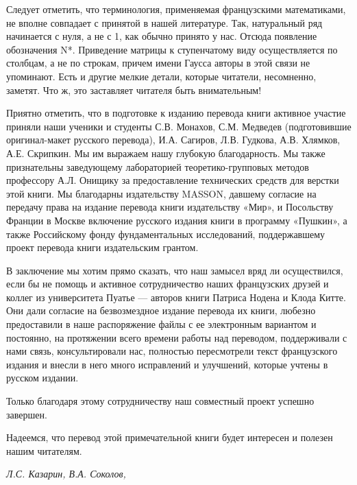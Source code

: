 {{   Следует отметить, что терминология, применяемая французскими математиками, не вполне совпадает с принятой в нашей литературе. Так, натуральный ряд начинается с нуля, а не с 1, как обычно принято у нас. Отсюда появление обозначения N*. Приведение матрицы к ступенчатому виду осуществляется по столбцам, а не по строкам, причем имени Гаусса авторы в этой связи не упоминают. Есть и другие мелкие детали, которые читатели, несомненно, заметят. Что ж, это заставляет читателя быть внимательным!

  Приятно отметить, что в подготовке к изданию перевода книги активное участие приняли наши ученики и студенты С.В. Монахов, С.М. Медведев (подготовившие оригинал-макет русского перевода), И.А. Сагиров, Л.В. Гудкова, А.В. Хлямков, А.Е. Скрипкин. Мы им выражаем нашу глубокую благодарность. Мы также признательны заведующему лабораторией теоретико-групповых методов профессору А.Л. Онищику за предоставление технических средств для верстки этой книги. Мы благодарны издательству MASSON, давшему согласие на передачу права на издание перевода книги издательству «Мир», и Посольству Франции в Москве включение русского издания книги
\pagebreak
в программу «Пушкин», а также Российскому фонду фундаментальных исследований, поддержавшему проект перевода книги издательским грантом.

   В заключение мы хотим прямо сказать, что наш замысел вряд ли осуществился, если бы не помощь и активное сотрудничество наших французских друзей и коллег из университета Пуатье — авторов книги Патриса Нодена и Клода Китте. Они дали согласие на безвозмездное издание перевода их книги, любезно предоставили в наше распоряжение файлы с ее электронным вариантом и постоянно, на протяжении всего времени работы над переводом, поддерживали с нами связь, консультировали нас, полностью пересмотрели текст французского издания и внесли в него много исправлений и улучшений, которые учтены в русском издании.
   
   Только благодаря этому сотрудничеству наш совместный проект успешно завершен.
   
   Надеемся, что перевод этой примечательной книги будет интересен и полезен нашим читателям.


 \hspace{3.1in} \textit {Л.С. Казарин, В.А. Соколов,} 
   
}}
